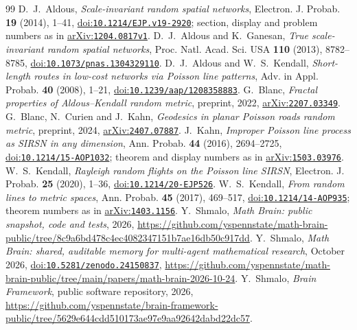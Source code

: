 \documentclass[11pt]{amsart}
\theoremstyle{remark}
\newcommand{\doi}[1]{\href{https://doi.org/#1}{doi:\nolinkurl{#1}}}
\newcommand{\arxiv}[1]{\href{https://arxiv.org/abs/#1}{arXiv:\nolinkurl{#1}}}
\begin{document}
\begin{thebibliography}{99}
 D.~J.~Aldous, \emph{Scale-invariant random spatial networks}, Electron. J. Probab. \textbf{19}
(2014), 1--41, \doi{10.1214/EJP.v19-2920}; section, display and problem numbers as in \arxiv{1204.0817v1}.
 D.~J.~Aldous and K.~Ganesan, \emph{True scale-invariant random spatial networks}, Proc. Natl. Acad. Sci.
USA \textbf{110} (2013), 8782--8785, \doi{10.1073/pnas.1304329110}.
 D.~J.~Aldous and W.~S.~Kendall, \emph{Short-length routes in low-cost networks via Poisson line
patterns}, Adv. in Appl. Probab. \textbf{40} (2008), 1--21, \doi{10.1239/aap/1208358883}.
 G.~Blanc, \emph{Fractal properties of Aldous--Kendall random metric}, preprint, 2022,
\arxiv{2207.03349}.
 G.~Blanc, N.~Curien and J.~Kahn, \emph{Geodesics in planar Poisson roads random metric}, preprint,
2024, \arxiv{2407.07887}.
 J.~Kahn, \emph{Improper Poisson line process as SIRSN in any dimension}, Ann. Probab. \textbf{44}
(2016), 2694--2725, \doi{10.1214/15-AOP1032}; theorem and display numbers as in \arxiv{1503.03976}.
 W.~S.~Kendall, \emph{Rayleigh random flights on the Poisson line SIRSN}, Electron. J.
Probab. \textbf{25} (2020), 1--36, \doi{10.1214/20-EJP526}.
 W.~S.~Kendall, \emph{From random lines to metric spaces}, Ann. Probab. \textbf{45} (2017),
469--517, \doi{10.1214/14-AOP935}; theorem numbers as in \arxiv{1403.1156}.
 Y.~Shmalo, \emph{Math Brain: public snapshot, code and tests}, 2026,
\url{https://github.com/yspennstate/math-brain-public/tree/8c9a6bd478c4ec4082347151b7ae16db50c917dd}.
 Y.~Shmalo, \emph{Math Brain: shared, auditable memory for multi-agent mathematical research},
October 2026, \doi{10.5281/zenodo.24150837},
\url{https://github.com/yspennstate/math-brain-public/tree/main/papers/math-brain-2026-10-24}.
 Y.~Shmalo, \emph{Brain Framework}, public software repository, 2026,
\url{https://github.com/yspennstate/brain-framework-public/tree/5629e644cdd510173ae97e9aa92642dabd22dc57}.
\end{thebibliography}
\end{document}
